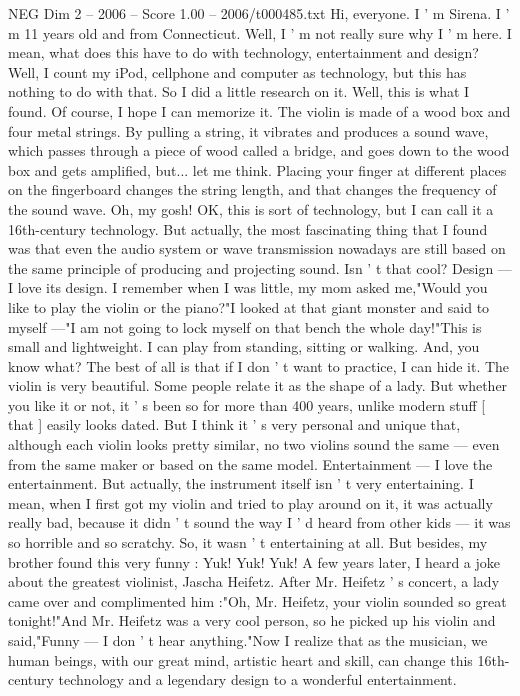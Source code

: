 \begin{textsample}{NEG Dim 2 – 2006 – Score 1.00 – 2006/t000485.txt}  \label{ex:f2_neg_013}
Hi, everyone.
I ' m Sirena.
I ' m 11 years old and from Connecticut.
Well, I ' m not really sure why I ' m here.
I mean, what does this have to do with technology, entertainment and design?
Well, I count my iPod, cellphone and computer as technology, but this has nothing to do with that.
So I did a little research on it.
Well, this is what I found.
Of course, I hope I can memorize it.
The violin is made of a wood box and four metal strings.
By pulling a string, it vibrates and produces a sound wave, which passes through a piece of wood called a bridge, and goes down to the wood box and gets amplified, but... let me think.
Placing your finger at different places on the fingerboard changes the string length, and that changes the frequency of the sound wave.
Oh, my gosh!
OK, this is sort of technology, but I can call it a 16th-century technology.
But actually, the most fascinating thing that I found was that even the audio system or wave transmission nowadays are still based on the same principle of producing and projecting sound.
Isn ' t that cool?
Design — I love its design.
I remember when I was little, my mom asked me,"Would you like to play the violin or the piano?"I looked at that giant monster and said to myself —"I am not going to lock myself on that bench the whole day!"This is small and lightweight.
I can play from standing, sitting or walking.
And, you know what?
The best of all is that if I don ' t want to practice, I can hide it.
The violin is very beautiful.
Some people relate it as the shape of a lady.
But whether you like it or not, it ' s been so for more than 400 years, unlike modern stuff [ that ] easily looks dated.
But I think it ' s very personal and unique that, although each violin looks pretty similar, no two violins sound the same — even from the same maker or based on the same model.
Entertainment — I love the entertainment.
But actually, the instrument itself isn ' t very entertaining.
I mean, when I first got my violin and tried to play around on it, it was actually really bad, because it didn ' t sound the way I ' d heard from other kids — it was so horrible and so scratchy.
So, it wasn ' t entertaining at all.
But besides, my brother found this very funny : Yuk!
Yuk!
Yuk!
A few years later, I heard a joke about the greatest violinist, Jascha Heifetz.
After Mr.
Heifetz ' s concert, a lady came over and complimented him :"Oh, Mr.
Heifetz, your violin sounded so great tonight!"And Mr.
Heifetz was a very cool person, so he picked up his violin and said,"Funny — I don ' t hear anything."Now I realize that as the musician, we human beings, with our great mind, artistic heart and skill, can change this 16th-century technology and a legendary design to a wonderful entertainment.

\end{textsample}
